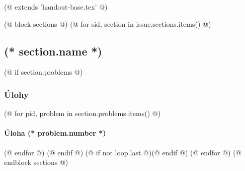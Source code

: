 (@ extends 'handout-base.tex' @)

(@ block sections @)
    (@ for sid, section in issue.sections.items() @)
        \subsection{(* section.name *)}
        (@ if section.problems @)
            \subsubsection{Úlohy}
            (@ for pid, problem in section.problems.items() @)
                \paragraph{Úloha (* problem.number *)}
            (@ endfor @)
        (@ endif @)
        (@ if not loop.last @)\newpage(@ endif @)
    (@ endfor @)
(@ endblock sections @)
